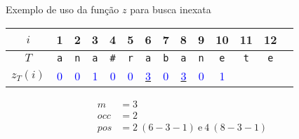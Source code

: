 \begin{frame}[fragile]{Exemplo de uso da função $z$ para busca inexata}

    \begin{center}
    \begin{tabular}{c|ccccccccccccc}
        $i$ & 1 & 2 & 3 & 4 & 5 & 6 & 7 & 8 & 9 & 10 & 11 & 12 \\
        \hline
        $T$
& \texttt{\textcolor{red!80!black}{a}} 
& \texttt{\textcolor{red!80!black}{n}} 
& \texttt{\textcolor{red!80!black}{a}} 
& \texttt{\textcolor{red!80!black}{\#}} 
& \texttt{\textcolor{red!80!black}{r}} 
& \texttt{\textcolor{red!80!black}{a}} 
& \texttt{\textcolor{red!80!black}{b}} 
& \texttt{\textcolor{red!80!black}{a}} 
& \texttt{\textcolor{red!80!black}{n}} 
& \texttt{\textcolor{red!80!black}{e}} 
& \texttt{\textcolor{red!80!black}{t}} 
& \texttt{\textcolor{red!80!black}{e}} 
\\
        $z_T(i)$
& \textcolor{blue}{0} 
& \textcolor{blue}{0} 
& \textcolor{blue}{1} 
& \textcolor{blue}{0} 
& \textcolor{blue}{0} 
& \underline{\textcolor{blue}{3}}
& \textcolor{blue}{0} 
& \underline{\textcolor{blue}{3}}
& \textcolor{blue}{0} 
& \textcolor{blue}{1} 
\\
    \end{tabular}
    \end{center}

    \begin{align*}
        m &= 3 \\
        occ &= 2 \\
        pos &= 2\ (6 - 3 - 1)\ \mbox{e}\ 4\ (8 - 3 - 1)
    \end{align*}
\end{frame}

